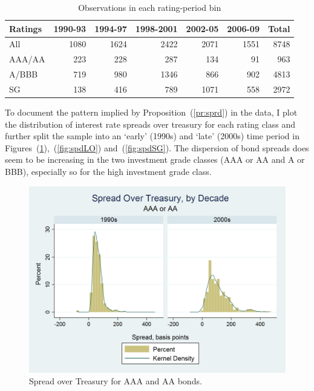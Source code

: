 \documentclass[notitlepage]{article}
\begin{document}
\begin{table}\centering
\begin{tabular}{l *{6}r}
\toprule
Ratings & 1990-93 & 1994-97 & 1998-2001 & 2002-05 & 2006-09 & Total\\ \midrule
All & 1080 & 1624 & 2422 & 2071 & 1551 & 8748\\
AAA/AA & 223 & 228 & 287 & 134 & 91 & 963\\ 
A/BBB & 719 & 980 & 1346 & 866 & 902 & 4813\\ 
SG & 138 & 416 & 789 & 1071 & 558 & 2972\\ 
\bottomrule
\end{tabular}
\caption{Observations in each rating-period bin}
\label{tab:sample}
\end{table}

To document the pattern implied by Proposition~(\ref{pr:sprd}) in the data, I plot the distribution of interest rate spreads over treasury for each rating class and further split the sample into an `early' (1990s) and `late' (2000s) time period in Figures~(\ref{fig:spdHI}),~(\ref{fig:spdLO}) and~(\ref{fig:spdSG}). The dispersion of bond spreads does seem to be increasing in the two investment grade classes (AAA or AA and A or BBB), especially so for the high investment grade class. 

\begin{figure}[ht]
\centering
\includegraphics[width=\textwidth]{Spread_HiIG.png}
\caption{Spread over Treasury for AAA and AA bonds.}
\label{fig:spdHI}
\end{figure}
\end{document}
